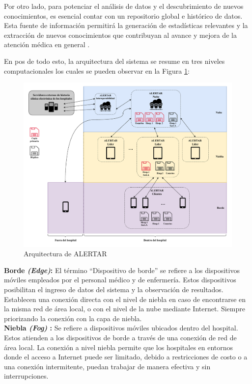 Por otro lado, para potenciar el análisis de datos y el descubrimiento de nuevos conocimientos, es esencial contar con un repositorio global e histórico de datos. Esta fuente de información permitirá la generación de estadísticas relevantes y la extracción de nuevos conocimientos que contribuyan al avance y mejora de la atención médica en general \cite{canibano2022towards}.

En pos de todo esto, la arquitectura del sistema se resume en tres niveles computacionales los cuales se pueden observar en la Figura \ref{fig:arqGeneral}:\\

\begin{figure}
    \centering
    \includegraphics[width=\textwidth]{Imagenes/Arquitectura General/Componentes del sistema.pdf}
    \caption{Arquitectura de ALERTAR}
    \label{fig:arqGeneral}
\end{figure}
\textbf{Borde \textit{(Edge)}:} El término ``Dispositivo de borde'' se refiere a los dispositivos móviles empleados por el personal médico y de enfermería. Estos dispositivos posibilitan el ingreso de datos del sistema y la observación de resultados. Establecen una conexión directa con el nivel de niebla en caso de encontrarse en la misma red de área local, o con el nivel de la nube mediante Internet. Siempre priorizando la conexión con la capa de niebla.\\


\textbf{Niebla \textit{(Fog)} :} Se refiere a dispositivos móviles ubicados dentro del hospital. Estos atienden a los dispositivos de borde a través de una conexión de red de área local. La conexión a nivel niebla permite que los hospitales en entornos donde el acceso a Internet puede ser limitado, debido a restricciones de costo o a una conexión intermitente, puedan trabajar de manera efectiva y sin interrupciones.\\

